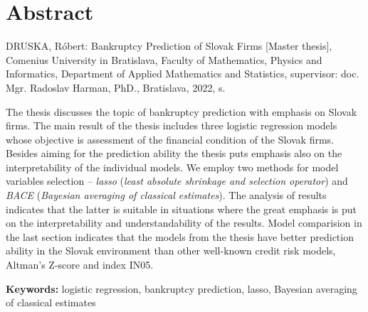 \thispagestyle{empty}
\section*{Abstract}
DRUSKA, Róbert: Bankruptcy Prediction of Slovak Firms [Master thesis],
Comenius University in Bratislava,
Faculty of Mathematics, Physics and Informatics,
Department of Applied Mathematics and Statistics,
supervisor: doc. Mgr. Radoslav Harman, PhD.,
Bratislava, 2022, \textnormal{\pageref*{LastPage}} s.

The thesis discusses the topic of bankruptcy prediction with emphasis on Slovak firms.
The main result of the thesis includes three logistic regression models whose objective is assessment of the financial condition of the Slovak firms.
Besides aiming for the prediction ability the thesis puts emphasis also on the interpretability of the individual models.
We employ two methods for model variables selection – \emph{lasso} (\emph{least absolute shrinkage and selection operator}) and \emph{BACE} (\emph{Bayesian averaging of classical estimates}).
The analysis of results indicates that the latter is suitable in situations where the great emphasis is put on the interpretability and understandability of the results.
Model comparision in the last section indicates that the models from the thesis have better prediction ability in the
Slovak environment than other well-known credit risk models, Altman’s Z-score and index IN05.

\begin{flushleft}
  \textbf{Keywords:} logistic regression, bankruptcy prediction, lasso, Bayesian averaging of classical estimates
\end{flushleft}